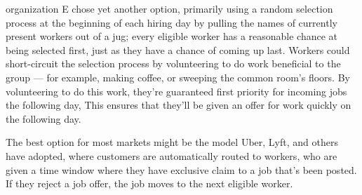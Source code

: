 organization E chose yet another option, primarily using a random selection process at the beginning of each hiring day by pulling the names of currently present workers out of a jug;
every eligible worker has a reasonable chance at being selected first, just as they have a chance of coming up last.
Workers could short-circuit the selection process by volunteering to do work beneficial to the group
--- for example, making coffee, or sweeping the common room's floors.
By volunteering to do this work, they're guaranteed first priority for incoming jobs the following day,
This ensures that they'll be given an offer for work quickly on the following day.

The best option for most markets might be the model Uber, Lyft, and others have adopted,
where customers are automatically routed to workers,
who are given a time window where they have exclusive claim to a job that's been posted.
If they reject a job offer, the job moves to the next eligible worker.

